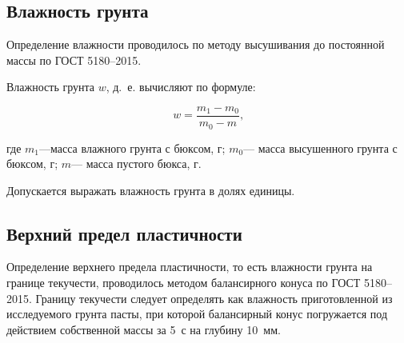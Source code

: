 
\subsection{Влажность грунта}

Определение влажности проводилось по методу высушивания до постоянной массы по ГОСТ 5180--2015. 
%

Влажность грунта $w$, д.~е. вычисляют по формуле:

\[
   w = \frac{m_1-m_0}{m_0-m} \text{,}
\]

где $m_1$---масса влажного грунта с бюксом, г;
$m_0$--- масса высушенного грунта с бюксом, г;
$m$--- масса пустого бюкса, г.

Допускается выражать влажность грунта в долях единицы.

\subsection{Верхний предел пластичности}

Определение верхнего предела пластичности, то есть влажности грунта на границе текучести, 
проводилось методом балансирного конуса по ГОСТ 5180--2015.
Границу текучести следует определять как влажность приготовленной из исследуемого грунта пасты, 
при которой балансирный конус погружается
под действием собственной массы за 5~с на глубину 10~мм.

